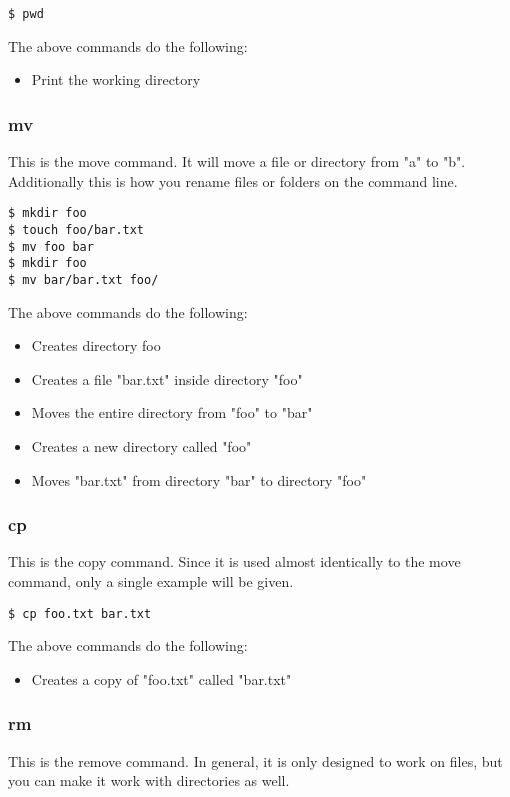 \begin{lstlisting}
$ pwd
\end{lstlisting}

The above commands do the following:
	\begin{itemize}
		\item Print the working directory
	\end{itemize}
	

\subsubsection{mv} \mdseries
This is the move command.  It will move a file or directory from "a" to "b".  Additionally this is how you rename files or folders on the command line.

\begin{lstlisting}
$ mkdir foo
$ touch foo/bar.txt
$ mv foo bar
$ mkdir foo 
$ mv bar/bar.txt foo/
\end{lstlisting}

The above commands do the following:
	\begin{itemize}
		\item Creates directory foo
		\item Creates a file "bar.txt" inside directory "foo"
		\item Moves the entire directory from "foo" to "bar"
		\item Creates a new directory called "foo"
		\item Moves "bar.txt" from directory "bar" to directory "foo"
	\end{itemize}


\subsubsection{cp} \mdseries
This is the copy command.  Since it is used almost identically to the move command, only a single example will be given.

\begin{lstlisting}
$ cp foo.txt bar.txt
\end{lstlisting}

The above commands do the following:
	\begin{itemize}
		\item Creates a copy of "foo.txt" called "bar.txt"
	\end{itemize}

\subsubsection{rm} \mdseries
This is the remove command.  In general, it is only designed to work on files, but you can make it work with directories as well.

